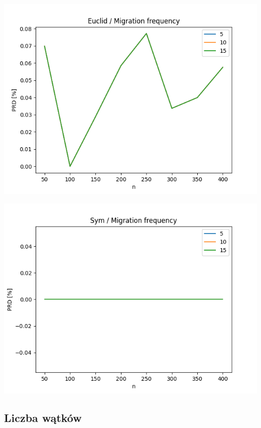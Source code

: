 \documentclass{article}
\begin{document}
\begin{center}
\includegraphics[width=\textwidth, 
                   height = 0.4\textheight, 
                   keepaspectratio]
                  {plots/euclid_11_migration_freq} 
\end{center}

\begin{center}
\includegraphics[width=\textwidth, 
                   height = 0.4\textheight, 
                   keepaspectratio]
                  {plots/sym_11_migration_freq} 
\end{center}


\subsection{Liczba wątków}
\end{document}
